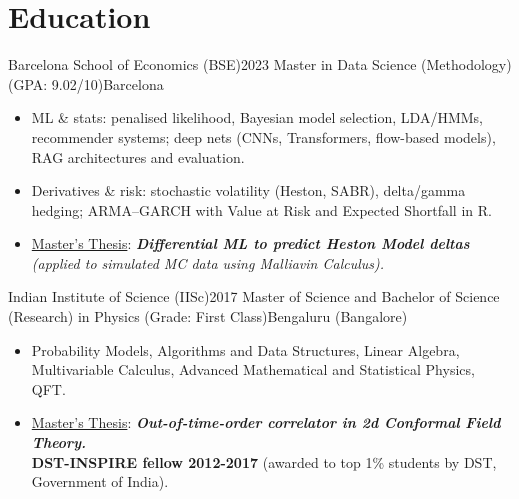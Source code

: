 \section*{Education}
\vspace{-2pt}
  \resumeSubHeadingListStart
    \resumeSubheading
  {Barcelona School of Economics (BSE)}{2023}
  {Master in Data Science (Methodology) (GPA: 9.02/10)}{Barcelona}
\begin{itemize}[leftmargin=*, noitemsep=2, partopsep=0pt]
\vspace{3pt}
    \item ML \& stats: penalised likelihood, Bayesian model selection, LDA/HMMs, recommender systems; deep nets (CNNs, Transformers, flow-based models), RAG architectures and evaluation.
\vspace{1pt}    
    \item Derivatives \& risk: stochastic volatility (Heston, SABR), delta/gamma hedging; ARMA–GARCH with Value at Risk and Expected Shortfall in R.
\vspace{1pt}
    \item \underline{Master's Thesis}: \textit{\textbf{Differential ML to predict Heston Model deltas} (applied to simulated MC data using Malliavin Calculus).} 

\end{itemize}    


    \resumeSubheading
      {Indian Institute of Science (IISc)}{2017}
      {Master of Science and Bachelor of Science (Research) in Physics  (Grade: First Class)}{Bengaluru (Bangalore)}
\begin{itemize}[leftmargin=*, noitemsep=2, partopsep=0pt]
\vspace{3pt}
    \item Probability Models, Algorithms and Data Structures, Linear Algebra, Multivariable Calculus, Advanced Mathematical and Statistical Physics, QFT.
\vspace{1pt}
    \item \underline{Master's Thesis}: \textit{\textbf{Out-of-time-order correlator in 2d Conformal Field Theory.}}\\
    \textbf{DST-INSPIRE fellow 2012-2017} (awarded to top 1\% students by DST, Government of India). 
\end{itemize}    

